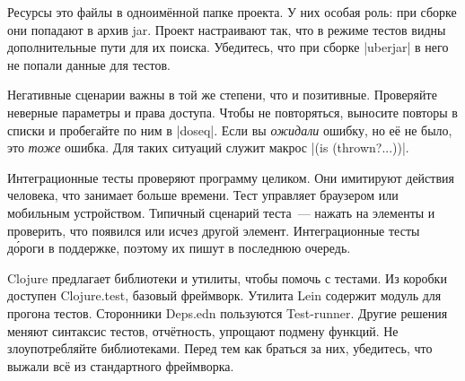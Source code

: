 Ресурсы это файлы в одноимённой папке проекта. У них особая роль: при сборке они
попадают в архив jar. Проект настраивают так, что в режиме тестов видны
дополнительные пути для их поиска. Убедитесь, что при сборке \spverb|uberjar| в
него не попали данные для тестов.

Негативные сценарии важны в той же степени, что и позитивные. Проверяйте
неверные параметры и права доступа. Чтобы не повторяться, выносите повторы в
списки и пробегайте по ним в \spverb|doseq|. Если вы \emph{ожидали} ошибку, но
её не было, это \emph{тоже} ошибка. Для таких ситуаций служит
макрос \spverb|(is (thrown?...))|.

Интеграционные тесты проверяют программу целиком. Они имитируют действия
человека, что занимает больше времени. Тест управляет браузером или мобильным
устройством. Типичный сценарий теста~--- нажать на элементы и проверить, что
появился или исчез другой элемент. Интеграционные тесты д\'{о}роги в поддержке,
поэтому их пишут в последнюю очередь.

Clojure предлагает библиотеки и утилиты, чтобы помочь с тестами. Из коробки
доступен Clojure.test, базовый фреймворк. Утилита Lein содержит модуль для
прогона тестов. Сторонники Deps.edn пользуются Test-runner. Другие решения
меняют синтаксис тестов, отчётность, упрощают подмену функций. Не
злоупотребляйте библиотеками. Перед тем как браться за них, убедитесь, что
выжали всё из стандартного фреймворка.
